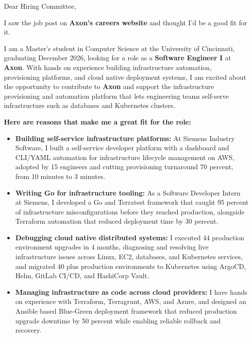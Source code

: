 \documentclass[11pt]{letter}
\date{}
\begin{document}
\begin{letter}{}

\opening{Dear Hiring Committee,}

I saw the job post on \textbf{Axon's careers website} and thought I'd be a good fit for it.

I am a Master's student in Computer Science at the University of Cincinnati, graduating December 2026, looking for a role as a \textbf{Software Engineer I} at \textbf{Axon}. With hands on experience building infrastructure automation, provisioning platforms, and cloud native deployment systems, I am excited about the opportunity to contribute to \textbf{Axon} and support the infrastructure provisioning and automation platform that lets engineering teams self-serve infrastructure such as databases and Kubernetes clusters.

\textbf{Here are reasons that make me a great fit for the role:}

\begin{itemize}[leftmargin=*, itemsep=0.45em]
    \item \textbf{Building self-service infrastructure platforms:} At Siemens Industry Software, I built a self-service developer platform with a dashboard and CLI/YAML automation for infrastructure lifecycle management on AWS, adopted by 15 engineers and cutting provisioning turnaround 70 percent, from 10 minutes to 3 minutes.

    \item \textbf{Writing Go for infrastructure tooling:} As a Software Developer Intern at Siemens, I developed a Go and Terratest framework that caught 95 percent of infrastructure misconfigurations before they reached production, alongside Terraform automation that reduced deployment time by 30 percent.

    \item \textbf{Debugging cloud native distributed systems:} I executed 44 production environment upgrades in 4 months, diagnosing and resolving live infrastructure issues across Linux, EC2, databases, and Kubernetes services, and migrated 40 plus production environments to Kubernetes using ArgoCD, Helm, GitLab CI/CD, and HashiCorp Vault.

    \item \textbf{Managing infrastructure as code across cloud providers:} I have hands on experience with Terraform, Terragrunt, AWS, and Azure, and designed an Ansible based Blue-Green deployment framework that reduced production upgrade downtime by 50 percent while enabling reliable rollback and recovery.


\end{itemize}
\end{letter}
\end{document}
